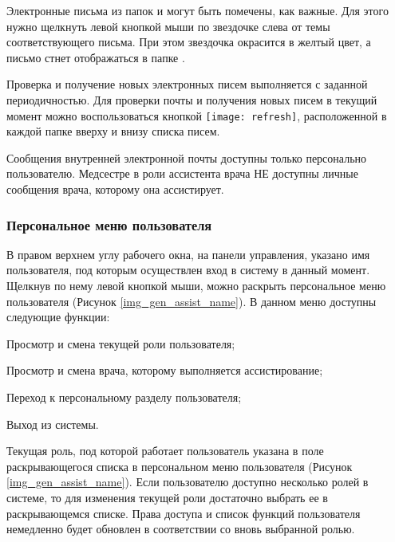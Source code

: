 Электронные письма из папок  и  могут быть помечены, как важные. Для этого нужно щелкнуть левой кнопкой мыши по звездочке слева от темы соответствующего письма. При этом звездочка окрасится в желтый цвет, а письмо стнет отображаться в папке .

Проверка и получение новых электронных писем выполняется с заданной периодичностью. Для проверки почты и получения новых писем в текущий момент можно воспользоваться кнопкой \texttt{[image: refresh]}, расположенной в каждой папке вверху и внизу списка писем.

{
\begin{vnim}
Сообщения внутренней электронной почты доступны только персонально пользователю. Медсестре в роли ассистента врача НЕ доступны личные сообщения врача, которому она ассистирует.
\end{vnim}
}{}

\subsubsection{Персональное меню пользователя}

В правом верхнем углу рабочего окна, на панели управления, указано имя пользователя, под которым осуществлен вход в систему в данный момент. Щелкнув по нему левой кнопкой мыши, можно раскрыть персональное меню пользователя (Рисунок \ref{img_gen_assist_name}). В данном меню доступны следующие функции:

\begin{itemize}
 \item Просмотр и смена текущей роли пользователя;
 {
 \item Просмотр и смена врача, которому выполняется ассистирование;
 }{}
 \item Переход к персональному разделу пользователя;
 \item Выход из системы.
\end{itemize}

Текущая роль, под которой работает пользователь указана в поле раскрывающегося списка в персональном меню пользователя (Рисунок \ref{img_gen_assist_name}). Если пользователю доступно несколько ролей в системе, то для изменения текущей роли достаточно выбрать ее в раскрывающемся списке. Права доступа и список функций пользователя немедленно будет обновлен в соответствии со вновь выбранной ролью. 

